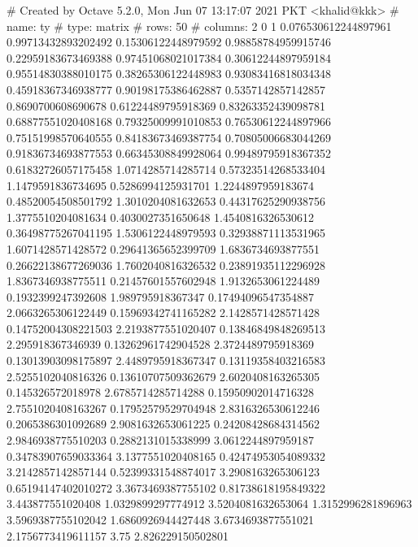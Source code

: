# Created by Octave 5.2.0, Mon Jun 07 13:17:07 2021 PKT <khalid@kkk>
# name: ty
# type: matrix
# rows: 50
# columns: 2
 0 1
 0.076530612244897961 0.99713432893202492
 0.15306122448979592 0.98858784959915746
 0.22959183673469388 0.97451068021017384
 0.30612244897959184 0.95514830388010175
 0.38265306122448983 0.93083416818034348
 0.45918367346938777 0.90198175386462887
 0.5357142857142857 0.8690700608690678
 0.61224489795918369 0.83263352439098781
 0.68877551020408168 0.79325009991010853
 0.76530612244897966 0.75151998570640555
 0.84183673469387754 0.70805006683044269
 0.91836734693877553 0.66345308849928064
 0.99489795918367352 0.61832726057175458
 1.0714285714285714 0.57323514268533404
 1.1479591836734695 0.5286994125931701
 1.2244897959183674 0.48520054508501792
 1.3010204081632653 0.44317625290938756
 1.3775510204081634 0.4030027351650648
 1.4540816326530612 0.36498775267041195
 1.5306122448979593 0.32938871113531965
 1.6071428571428572 0.29641365652399709
 1.6836734693877551 0.26622138677269036
 1.7602040816326532 0.23891935112296928
 1.8367346938775511 0.21457601557602948
 1.9132653061224489 0.1932399247392608
 1.989795918367347 0.17494096547354887
 2.0663265306122449 0.15969342741165282
 2.1428571428571428 0.14752004308221503
 2.2193877551020407 0.13846849848269513
 2.295918367346939 0.13262961742904528
 2.3724489795918369 0.13013903098175897
 2.4489795918367347 0.13119358403216583
 2.5255102040816326 0.13610707509362679
 2.6020408163265305 0.145326572018978
 2.6785714285714288 0.15950902014716328
 2.7551020408163267 0.17952579529704948
 2.8316326530612246 0.2065386301092689
 2.9081632653061225 0.24208428684314562
 2.9846938775510203 0.2882131015338999
 3.0612244897959187 0.34783907659033364
 3.1377551020408165 0.42474953054089332
 3.2142857142857144 0.52399331548874017
 3.2908163265306123 0.65194147402010272
 3.3673469387755102 0.81738618195849322
 3.443877551020408 1.0329899297774912
 3.5204081632653064 1.3152996281896963
 3.5969387755102042 1.6860926944427448
 3.6734693877551021 2.1756773419611157
 3.75 2.826229150502801


